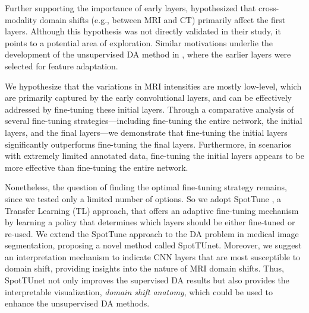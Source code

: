 Further supporting the importance of early layers, \cite{dou2018unsupervised} hypothesized that cross-modality domain shifts (e.g., between MRI and CT) primarily affect the first layers. Although this hypothesis was not directly validated in their study, it points to a potential area of exploration. Similar motivations underlie the development of the unsupervised DA method in \cite{zhao2021robust}, where the earlier layers were selected for feature adaptation.

We hypothesize that the variations in MRI intensities are mostly low-level, which are primarily captured by the early convolutional layers, and can be effectively addressed by fine-tuning these initial layers. Through a comparative analysis of several fine-tuning strategies---including fine-tuning the entire network, the initial layers, and the final layers---we demonstrate that fine-tuning the initial layers significantly outperforms fine-tuning the final layers. Furthermore, in scenarios with extremely limited annotated data, fine-tuning the initial layers appears to be more effective than fine-tuning the entire network.

Nonetheless, the question of finding the optimal fine-tuning strategy remains, since we tested only a limited number of options. So we adopt SpotTune \cite{guo2019spottune}, a Transfer Learning (TL) approach, that offers an adaptive fine-tuning mechanism by learning a policy that determines which layers should be either fine-tuned or re-used. We extend the SpotTune approach to the DA problem in medical image segmentation, proposing a novel method called SpotTUnet. Moreover, we suggest an interpretation mechanism to indicate CNN layers that are most susceptible to domain shift, providing insights into the nature of MRI domain shifts. Thus, SpotTUnet not only improves the supervised DA results but also provides the interpretable visualization, \textit{domain shift anatomy}, which could be used to enhance the unsupervised DA methods.





